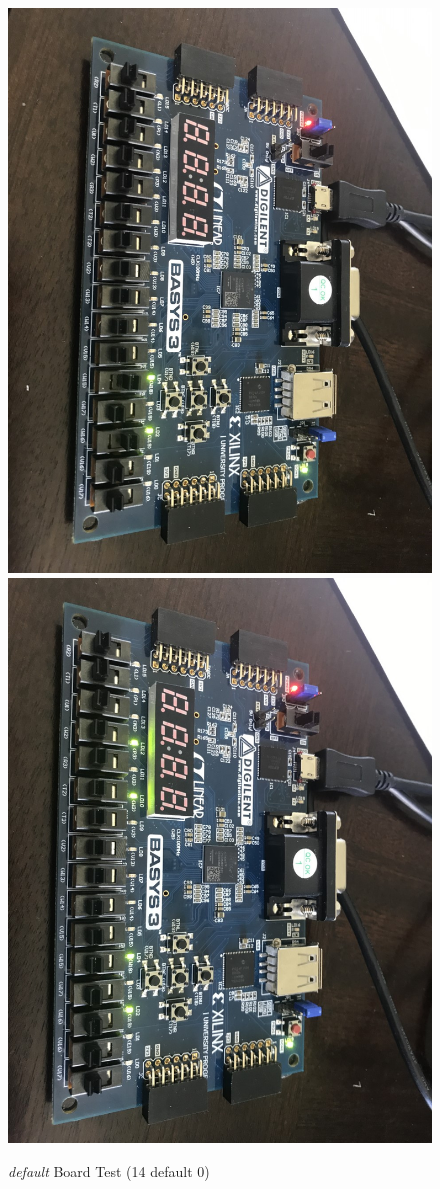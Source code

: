 \documentclass[11pt]{article}
\begin{document}
\begin{figure}[ht]\centering
	\includegraphics[angle=90, width=.8\textwidth]{default1}
	\includegraphics[angle=90, width=.8\textwidth]{default2}
	\caption{\textit{default} Board Test (14 default 0)}
	\label{fig:sim_with_table}
\end{figure}
\end{document}
